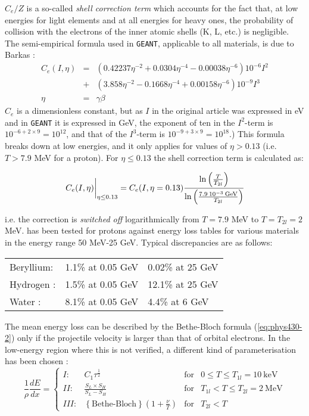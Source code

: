 $C_e/Z$ is a so-called {\it shell correction term}
which accounts for the fact that, at
low energies for light elements and at all energies for heavy ones, the
probability of collision with the electrons of the inner atomic shells
(K, L, etc.) is negligible. The semi-empirical formula used in
{\tt GEANT}, applicable to all materials, is due to Barkas \cite{bib-BARK}:
\begin{eqnarray*}
 C_e(I,\eta) & = & (0.42237\eta^{-2}+0.0304\eta^{-4}-0.00038\eta^{-6})
10^{-6} I^2 \\
& +& (3.858\eta^{-2}-0.1668\eta^{-4}+0.00158\eta^{-6})10^{-9}I^3 \\
\eta & = &  \gamma \beta
\end{eqnarray*}
$C_e$ is a dimensionless constant, but as $I$ in the original
article was expressed in eV and in {\tt GEANT} it is expressed in GeV,
the exponent of ten in the $I^2$-term is $10^{-6+2 \times 9} = 10^{12}$, and
that of the $I^3$-term is $10^{-9+3 \times 9} = 10^{18}$.)
This formula breaks down at low energies, and it only applies for values 
of $\eta > 0.13$ (i.e. $T > 7.9$ MeV for a proton). For $\eta \leq
0.13$ the shell correction term is calculated as:

\[
\left . C_{e}(I,\eta) \rule{0mm}{5mm} \right |_{\eta \leq
0.13} = C_{e}(I,\eta=0.13)\frac{\ln \left ( \frac{T}{T_{2l}} \right )}
{\ln \left ( \frac{7.9 \: 10^{-3} \: \rm GeV}{T_{2l}} \right )}
\]
 
i.e. the correction is {\it switched off} logarithmically from $T=7.9$
MeV to $T=T_{2l}=2$ MeV.
 has been tested for protons against energy loss tables 
\cite{bib-SERR,bib-SER1}
for various materials in the energy range 50 MeV-25 GeV. 
Typical discrepancies are as follows:
 
\begin{flushleft}
\begin{tabular}{lll}
Beryllium: &   1.1\%  at 0.05 GeV      &  0.02\%  at  25 GeV\\
Hydrogen : &   1.5\%  at 0.05 GeV      &  12.1\%  at  25 GeV\\
Water   :  &   8.1\%  at 0.05 GeV      &  4.4\%  at  6  GeV\\
\end{tabular}
\end{flushleft}

The mean energy loss can be described by the Bethe-Bloch formula 
(\ref{eq:phys430-2}) only if the projectile velocity is larger than that
of orbital electrons. In the low-energy region where this is not 
verified, a different kind of parameterisation has been chosen \cite{bib-ANZI}:
\[
\frac{1}{\rho} \frac{dE}{dx} =  \left \{
\begin{array}{rLcL}
I: & C_{1} \tau^{\frac{1}{2}} & \mbox{for} & 0 \leq T \leq T_{1l} = 10 \:
\mbox{keV} \\
II: & \frac{S_{L} \times S_{H}}{S_{L} - S_{H}} & \mbox{for} & T_{1l}
< T \leq T_{2l} = 2 \: \mbox{MeV} \\
III: & \left \{ \mbox{Bethe-Bloch} \right \} \left ( 1+\frac{\nu}{T} \right )
& \mbox{for} & T_{2l} < T
\end{array} \right .
\]

